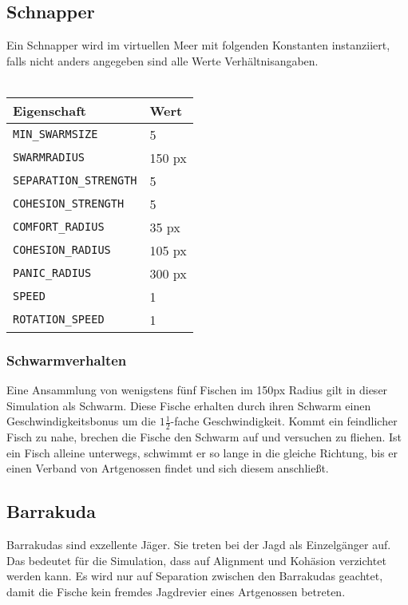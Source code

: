 \documentclass[11pt]{article}
\begin{document}
\subsection{Schnapper}
Ein Schnapper wird im virtuellen Meer mit folgenden Konstanten instanziiert, falls nicht anders angegeben sind alle Werte Verhältnisangaben. \\\\
\begin{tabular}{|l|l|}
\hline
	\textbf{Eigenschaft} & \textbf{Wert}\\
\hline
\hline
	\lstinline[]$MIN_SWARMSIZE$  & 5\\
\hline
	\lstinline[]$SWARMRADIUS$ & 150 px\\
\hline
	\lstinline[]$SEPARATION_STRENGTH$ & 5\\
\hline
	\lstinline[]$COHESION_STRENGTH$ & 5\\
\hline
	\lstinline[]$COMFORT_RADIUS$ & 35 px\\
\hline
	\lstinline[]$COHESION_RADIUS$ & 105 px\\
\hline
	\lstinline[]$PANIC_RADIUS$ & 300 px\\
\hline
	\lstinline[]$SPEED$ & 1\\
\hline
	\lstinline[]$ROTATION_SPEED$ & 1\\
\hline
\end{tabular}

\subsubsection{Schwarmverhalten}
Eine Ansammlung von wenigstens fünf Fischen im 150px Radius gilt in dieser Simulation als Schwarm. Diese Fische erhalten durch ihren Schwarm einen Geschwindigkeitsbonus um die \( 1 \frac{1}{2} \)-fache Geschwindigkeit.
Kommt ein feindlicher Fisch zu nahe, brechen die Fische den Schwarm auf und versuchen zu fliehen. Ist ein Fisch alleine unterwegs, schwimmt er so lange in die gleiche Richtung, bis er einen Verband von Artgenossen findet und sich diesem anschließt.

\subsection{Barrakuda}
Barrakudas sind exzellente Jäger. Sie treten bei der Jagd als Einzelgänger auf. Das bedeutet für die Simulation, dass auf Alignment und Kohäsion verzichtet werden kann. Es wird nur auf Separation zwischen den Barrakudas geachtet, damit die Fische kein fremdes Jagdrevier eines Artgenossen betreten.\\
\end{document}
